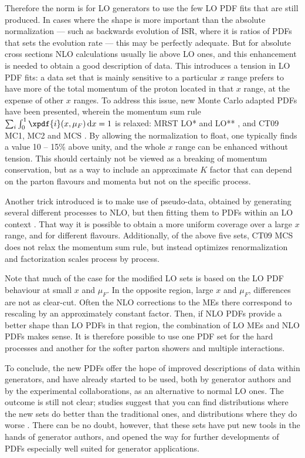 Therefore the norm is for LO generators to use the few LO PDF fits
that are still produced. In cases where the shape is more important
than the absolute normalization --- such as backwards evolution of ISR,
where it is ratios of PDFs that sets the evolution rate --- this may
be perfectly adequate. But for absolute cross sections NLO calculations 
usually lie above LO ones, and this enhancement is needed 
to obtain a good description of data. This introduces a tension in LO 
PDF fits: a data set that is mainly sensitive to a particular $x$ range
prefers to have more of the total momentum of the proton located in
that $x$ range, at the expense of other $x$ ranges. To address this 
issue, new Monte Carlo adapted PDFs have been presented, wherein the 
momentum sum rule $\sum_i \int_0^1 \xpdf{i}(x, \mu_F) \, \mathrm{d}x = 1$
is relaxed: MRST LO* and LO** \cite{Sherstnev:2007nd}, 
and CT09 MC1, MC2 and MCS \cite{Lai:2009ne}. By allowing the 
normalization to float, one typically finds a value 10 -- 15\% above 
unity, and the whole $x$ range 
can be enhanced without tension. This should certainly not be viewed 
as a breaking of momentum conservation, but as a way to include an 
approximate $K$ factor that can depend on the parton flavours and
momenta but not on the specific process.

Another trick introduced is to make use of pseudo-data, obtained by 
generating several different processes to NLO, but then fitting them
to PDFs within an LO context \cite{Lai:2009ne}. That way it is possible 
to obtain a more uniform coverage over a large $x$ range, and for 
different flavours. Additionally, of the above five sets, CT09 MCS 
does not relax the momentum sum rule, but instead optimizes
renormalization and factorization scales process by process.

Note that much of the case for the modified LO sets is based
on the LO PDF behaviour at small $x$ and $\mu_F$. In the opposite region,
large $x$ and $\mu_F$, differences are not  as clear-cut. Often the NLO
corrections to the MEs there correspond to rescaling by an approximately
constant factor. Then, if NLO PDFs provide a better shape than LO PDFs
in that region, the combination of LO MEs and NLO PDFs makes sense.
It is therefore possible to use one PDF set for the hard processes and 
another for the softer parton showers and multiple interactions. 

To conclude, the new PDFs offer the hope of improved descriptions 
of data within generators, and have already started to be used, both
by generator authors and by the experimental collaborations, as an
alternative to normal LO ones. The outcome is still not clear; studies
suggest that you can find distributions where the new sets do better 
than the traditional ones, and distributions where they do worse
\cite{Kasemets:2010sg}. There can be no doubt, however, that these
sets have put new tools in the hands of generator authors, and
opened the way for further developments of PDFs especially well suited
for generator applications.

